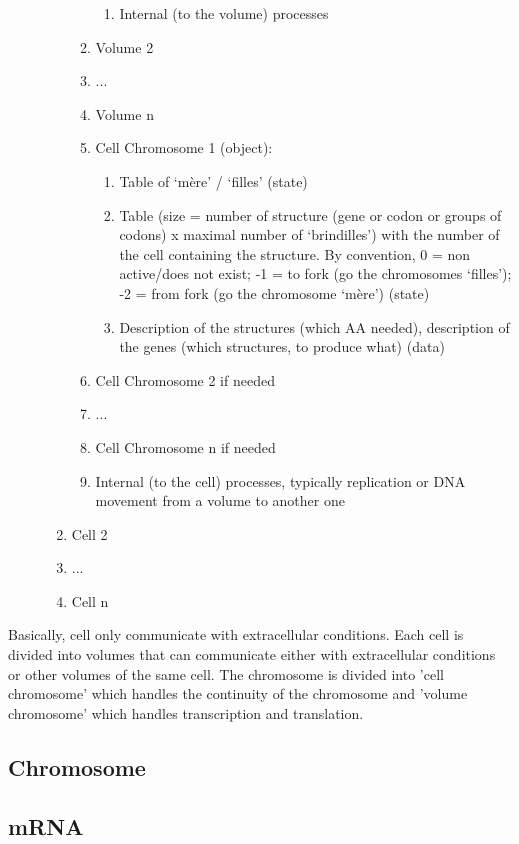 \begin{description}
\begin{enumerate}
\begin{enumerate}
\begin{enumerate}
        \item Internal (to the volume) processes
      \end{enumerate}
      \item Volume 2
      \item ...
      \item Volume n
      \item Cell Chromosome 1 (object):
      \begin{enumerate}
        \item Table of ‘mère’ / ‘filles’ (state)
        \item Table (size = number of structure (gene or codon or groups of codons) x maximal number of ‘brindilles’) with the number of the cell containing the structure. By convention, 0 = non active/does not exist; -1 = to fork (go the chromosomes ‘filles’); -2 = from fork (go the chromosome ‘mère’) (state)
        \item Description of the structures (which AA needed), description of the genes (which structures, to produce what) (data)
      \end{enumerate}
      \item Cell Chromosome 2 if needed
      \item ...
      \item Cell Chromosome n if needed
      \item Internal (to the cell) processes, typically replication or DNA movement from a volume to another one
      \end{enumerate}
    \item Cell 2
    \item ...
    \item Cell n
  \end{enumerate}
\end{description}
Basically, cell only communicate with extracellular conditions. Each cell is divided into volumes that can communicate either with extracellular conditions or other volumes of the same cell. The chromosome is divided into 'cell chromosome' which handles the continuity of the chromosome and 'volume chromosome' which handles transcription and translation.



\subsection{Chromosome}


\subsection{mRNA}



